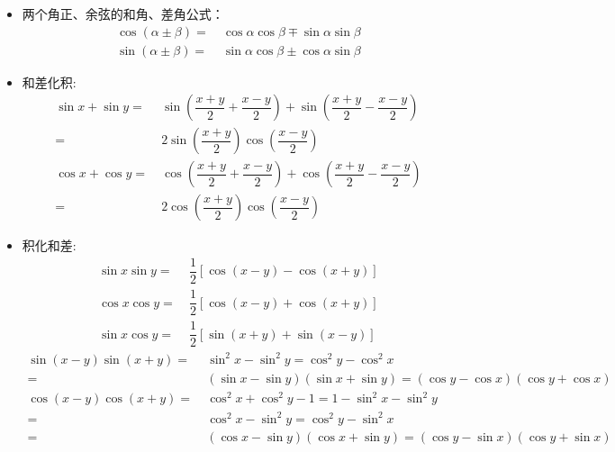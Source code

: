 \begin{itemize}[leftmargin=\inteval{\myitemleftmargin}pt,itemsep=
   \inteval{\myitemitempsep}pt,topsep=\inteval{\myitemtopsep}pt]
\item 两个角正、余弦的和角、差角公式：
\begin{align*} 
\cos(\alpha\pm\beta )=&\ \cos\alpha\cos\beta \mp \sin\alpha\sin\beta \\
\sin(\alpha\pm\beta )=&\ \sin\alpha\cos\beta \pm \cos\alpha\sin\beta 
\end{align*}

\item 和差化积:
\begin{align*}
\sin x+\sin y=&\  \sin \left(\dfrac{x+y}{2} +\dfrac{x-y}{2} \right) +\sin \left(\dfrac{x+y}{2}-\dfrac{x-y}{2} \right)\\
=&\  2\sin \left(\dfrac{x+y}{2}\right) \cos\left(\dfrac{x-y}{2}\right) \\ 
\cos x+\cos y=&\  \cos \left(\dfrac{x+y}{2} +\dfrac{x-y}{2} \right) +\cos \left(\dfrac{x+y}{2}-\dfrac{x-y}{2} \right)\\
=&\  2\cos \left(\dfrac{x+y}{2}\right) \cos  \left(\dfrac{x-y}{2}\right)	
\end{align*}
\item 积化和差:
\begin{align*}
\sin x\sin y=&\ \dfrac{1}{2}[\cos(x-y)-\cos(x+y)] \\
\cos x\cos y=&\ \dfrac{1}{2}[\cos(x-y)+\cos(x+y)] \\	
\sin x\cos y=&\ \dfrac{1}{2}[\sin(x+y)+\sin(x-y)] 
\end{align*}
\begin{align*}
\sin(x-y)\sin(x+y) =&\ \sin^2 x-\sin^2y=\cos^2 y-\cos^2 x \\
=&\ (\sin x-\sin y)(\sin x+\sin y)=(\cos y-\cos x)(\cos y+\cos x) \\
\cos(x-y)\cos(x+y) =&\ \cos^2 x+\cos^2 y-1=1-\sin^2 x-\sin^2 y \\
=&\ \cos^2 x-\sin^2 y=\cos^2 y-\sin^2 x \\
=&\ (\cos x-\sin y)(\cos x+\sin y)=(\cos y-\sin x)(\cos y+\sin x)
\end{align*}


\end{itemize}
